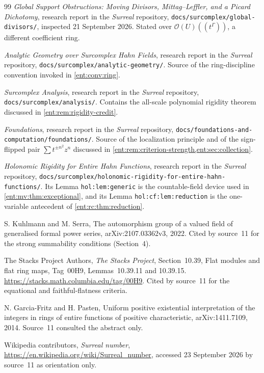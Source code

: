 \documentclass[11pt]{article}
\theoremstyle{plain}
\theoremstyle{plain}
\theoremstyle{plain}
\theoremstyle{definition}
\theoremstyle{definition}
\theoremstyle{definition}
\theoremstyle{definition}
\theoremstyle{remark}
\begin{document}
\begin{thebibliography}{99}
\emph{Global Support Obstructions: Moving Divisors, Mittag--Leffler, and a
Picard Dichotomy}, research report in the \emph{Surreal} repository,
\texttt{docs/surcomplex/global-divisors/}, inspected 21 September 2026.
Stated over $\mathcal O(U)((t^\Gamma))$, a different coefficient ring.

\emph{Analytic Geometry over Surcomplex Hahn Fields}, research report in the
\emph{Surreal} repository, \texttt{docs/surcomplex/analytic-geometry/}.
Source of the ring-discipline convention invoked in \cref{ent:conv:ring}.

\emph{Surcomplex Analysis}, research report in the \emph{Surreal}
repository, \texttt{docs/surcomplex/analysis/}. Contains the all-scale
polynomial rigidity theorem discussed in \cref{ent:rem:rigidity-credit}.

\emph{Foundations}, research report in the \emph{Surreal} repository,
\texttt{docs/foundations-and-computation/foundations/}. Source of the
localization principle and of the sign-flipped pair
$\sum t^{\pm n^2}z^n$ discussed in
\cref{ent:rem:criterion-strength,ent:sec:collection}.

\emph{Holonomic Rigidity for Entire Hahn Functions}, research report in the
\emph{Surreal} repository,
\texttt{docs/surcomplex/holonomic-rigidity-for-entire-hahn-functions/}. Its
Lemma \texttt{hol:lem:generic} is the countable-field device used in
\cref{ent:mv:thm:exceptional}, and its Lemma \texttt{hol:cf:lem:reduction} is
the one-variable antecedent of \cref{ent:rc:thm:reduction}.

S. Kuhlmann and M. Serra, The automorphism group of a valued field of
generalised formal power series, arXiv:2107.03362v3, 2022. Cited by source~11
for the strong summability conditions (Section~4).

The Stacks Project Authors, \emph{The Stacks Project}, Section~10.39, Flat
modules and flat ring maps, Tag~00H9, Lemmas~10.39.11 and 10.39.15.
\url{https://stacks.math.columbia.edu/tag/00H9}. Cited by source~11 for the
equational and faithful-flatness criteria.

N. Garcia-Fritz and H. Pasten, Uniform positive existential interpretation of
the integers in rings of entire functions of positive characteristic,
arXiv:1411.7109, 2014. Source~11 consulted the abstract only.

Wikipedia contributors, \emph{Surreal number},
\url{https://en.wikipedia.org/wiki/Surreal_number}, accessed 23 September 2026
by source~11 as orientation only.


\end{thebibliography}
\end{document}
